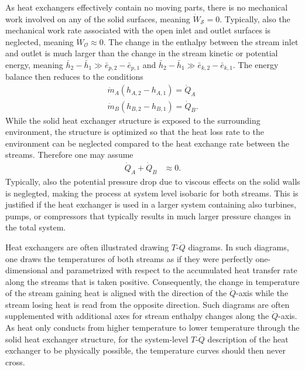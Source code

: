 As heat exchangers effectively contain no moving parts, there is no mechanical work involved on any of the solid surfaces, meaning $\dot{W}_\mathcal{S}=0$. Typically, also the mechanical work rate associated with the open inlet and outlet surfaces is neglected, meaning $\dot{W}_\mathcal{O}\approx 0$. The change in the enthalpy between the stream inlet and outlet is much larger than the change in the stream kinetic or potential energy, meaning $\bar{h}_2-\bar{h}_1\gg\bar{e}_{p,2}-\bar{e}_{p,1}$ and $\bar{h}_2-\bar{h}_1\gg\bar{e}_{k,2}-\bar{e}_{k,1}$. The energy balance then reduces to the conditions
\begin{align}
    \dot{m}_A(h_{A,2}-h_{A,1})=\dot{Q}_{A}\\
    \dot{m}_B(h_{B,2}-h_{B,1})=\dot{Q}_{B}.    
\end{align}
While the solid heat exchanger structure is exposed to the surrounding environment, the structure is optimized so that the heat loss rate to the environment can be neglected compared to the heat exchange rate between the streams. Therefore one may assume 
\begin{align}
    \dot{Q}_A+\dot{Q}_B&\approx0.
\end{align}
Typically, also the potential pressure drop due to viscous effects on the solid walls is neglegted, making the process at system level isobaric for both streams. This is justified if the heat exchanger is used in a larger system containing also turbines, pumps, or compressors that typically results in much larger pressure changes in the total system.

Heat exchangers are often illustrated drawing $T$-$\dot{Q}$ diagrams. In such diagrams, one draws the temperatures of both streams as if they were perfectly one-dimensional and parametrized with respect to the accumulated heat transfer rate along the streams that is taken positive. Consequently, the change in temperature of the stream gaining heat is aligned with the direction of the $\dot{Q}$-axis while the stream losing heat is read from the opposite direction. Such diagrams are often supplemented with additional axes for stream enthalpy changes along the $\dot{Q}$-axis. As heat only conducts from higher temperature to lower temperature through the solid heat exchanger structure, for the system-level $T$-$\dot{Q}$ description of the heat exchanger to be physically possible, the temperature curves should then never cross. 

